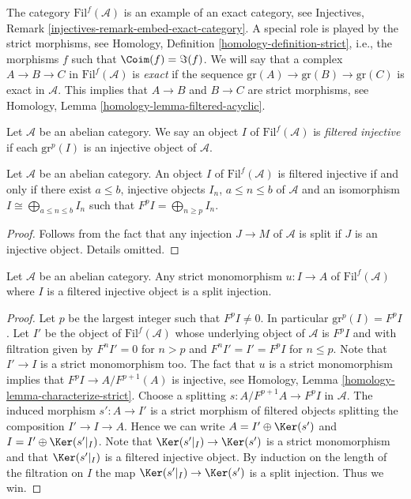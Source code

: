 \medskip\noindent
The category $\text{Fil}^f(\mathcal{A})$ is an example of an
exact category, see
Injectives, Remark \ref{injectives-remark-embed-exact-category}.
A special role is played by the strict morphisms, see
Homology, Definition \ref{homology-definition-strict},
i.e., the morphisms $f$ such that $\Coim(f) = \Im(f)$.
We will say that a complex $A \to B \to C$ in $\text{Fil}^f(\mathcal{A})$ is
{\it exact} if the sequence $\text{gr}(A) \to \text{gr}(B) \to \text{gr}(C)$
is exact in $\mathcal{A}$. This implies that $A \to B$ and $B \to C$
are strict morphisms, see
Homology, Lemma \ref{homology-lemma-filtered-acyclic}.

\begin{definition}
\label{definition-filtered-complexes-notation}
Let $\mathcal{A}$ be an abelian category.
We say an object $I$ of $\text{Fil}^f(\mathcal{A})$
is {\it filtered injective} if each $\text{gr}^p(I)$ is
an injective object of $\mathcal{A}$.
\end{definition}

\begin{lemma}
\label{lemma-filtered-injective}
Let $\mathcal{A}$ be an abelian category.
An object $I$ of $\text{Fil}^f(\mathcal{A})$ is filtered injective
if and only if
there exist $a \leq b$, injective objects $I_n$, $a \leq n \leq b$
of $\mathcal{A}$ and an isomorphism $I \cong \bigoplus_{a \leq n \leq b} I_n$
such that $F^pI = \bigoplus_{n \geq p} I_n$.
\end{lemma}

\begin{proof}
Follows from the fact that any injection $J \to M$ of $\mathcal{A}$
is split if $J$ is an injective object. Details omitted.
\end{proof}

\begin{lemma}
\label{lemma-split-strict-monomorphism}
Let $\mathcal{A}$ be an abelian category.
Any strict monomorphism $u : I \to A$ of $\text{Fil}^f(\mathcal{A})$
where $I$ is a filtered injective object is a split injection.
\end{lemma}

\begin{proof}
Let $p$ be the largest integer such that $F^pI \not = 0$.
In particular $\text{gr}^p(I) = F^pI$.
Let $I'$ be the object of $\text{Fil}^f(\mathcal{A})$ whose
underlying object of $\mathcal{A}$ is $F^pI$ and with filtration
given by $F^nI' = 0$ for $n > p$ and $F^nI' = I' = F^pI$ for
$n \leq p$. Note that $I' \to I$ is a strict monomorphism too.
The fact that $u$ is a strict monomorphism implies that
$F^pI \to A/F^{p + 1}(A)$ is injective, see
Homology, Lemma \ref{homology-lemma-characterize-strict}.
Choose a splitting $s : A/F^{p + 1}A \to F^pI$ in $\mathcal{A}$.
The induced morphism $s' : A \to I'$ is a strict morphism of
filtered objects splitting the composition $I' \to I \to A$.
Hence we can write $A = I' \oplus \Ker(s')$ and
$I = I' \oplus \Ker(s'|_I)$. Note that
$\Ker(s'|_I) \to \Ker(s')$ is a strict monomorphism
and that $\Ker(s'|_I)$ is a filtered injective object.
By induction on the length of the filtration on $I$ the map
$\Ker(s'|_I) \to \Ker(s')$ is a split injection.
Thus we win.
\end{proof}

